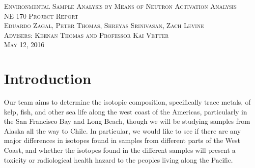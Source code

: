 \documentclass[]{article}
\begin{document}
\doublespacing
{}

\begin{titlepage}
\null{}
\begin{center}
\textsc{\LARGE Environmental Sample Analysis by Means of Neutron Activation Analysis}\\[1.5cm]

\textsc{\Large NE 170 Project Report}\\[0.5cm]
\textsc{\Large Eduardo Zagal, Peter Thomas, Shreyas Srinivasan, Zach Levine}\\[0.5cm] %
\textsc{\Large Advisers: Keenan Thomas and Professor Kai Vetter}\\[0.5cm]
\textsc{\Large May 12, 2016}\\[0.5cm] %
\end{center}
\end{titlepage}
\pagebreak


\tableofcontents

\pagebreak


\singlespacing

\section{Introduction}
Our team aims to determine the isotopic composition, specifically trace metals, of kelp, fish, and other sea life along the west coast of the Americas, particularly in the San Francisco Bay and Long Beach, though we will be studying samples from Alaska all the way to Chile. In particular, we would like to see if there are any major differences in isotopes found in samples from different parts of the West Coast, and whether the isotopes found in the different samples will present a toxicity or radiological health hazard to the peoples living along the Pacific.
\end{document}
